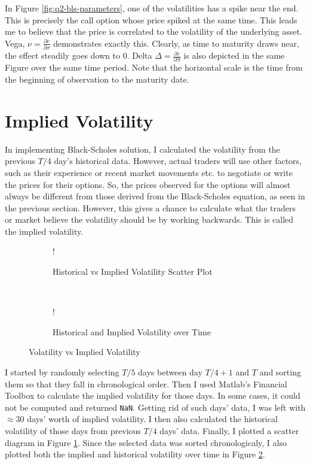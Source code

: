 \documentclass[11pt, fleqn]{article}
\begin{document}
In Figure \ref{fig:q2-bls-parameters}, one of the volatilities has a spike near the end. This is precisely the call option whose price spiked at the same time. This leads me to believe that the price is correlated to the volatility of the underlying asset. Vega, $\nu=\frac{\partial c}{\partial \sigma}$ demonstrates exactly this. Clearly, as time to maturity draws near, the effect steadily goes down to 0. Delta $\Delta=\frac{\partial c}{\partial S}$ is also depicted in the same Figure over the same time period. Note that the horizontal scale is the time from the beginning of observation to the maturity date.

\section{Implied Volatility}

In implementing Black-Scholes solution, I calculated the volatility from the previous $T/4$ day's historical data. However, actual traders will use other factors, such as their experience or recent market movements etc. to negotiate or write the prices for their options. So, the prices observed for the options will almost always be different from those derived from the Black-Scholes equation, as seen in the previous section. However, this gives a chance to calculate what the traders or market believe the volatility should be by working backwards. This is called the implied volatility.

\begin{figure}[!h]
   \centering 
   \begin{subfigure}[b]{0.45\textwidth}
     	\resizebox {\textwidth} {!} { }
		\caption{Historical vs Implied Volatility Scatter Plot}
		\label{fig:q3-historical-vs-implied-volatility}
    \end{subfigure}
    ~
    \begin{subfigure}[b]{0.44\textwidth}
       	\resizebox {\textwidth} {!} { }
		\caption{Historical and Implied Volatility over Time}
        \label{fig:q3-volatility-days}
    \end{subfigure}
    \caption{Volatility vs Implied Volatility}
	\label{fig:vol-vs-impl-vol}
\end{figure}

I started by randomly selecting $T/5$ days between day $T/4+1$ and $T$ and sorting them so that they fall in chronological order. Then I used Matlab's Financial Toolbox to calculate the implied volatility for those days. In some cases, it could not be computed and returned \texttt{NaN}. Getting rid of such days' data, I was left with $\approx 30$ days' worth of implied volatility. I then also calculated the historical volatility of those days from previous $T/4$ days' data. Finally, I plotted a scatter diagram in Figure \ref{fig:q3-historical-vs-implied-volatility}. Since the selected data was sorted chronologicaly, I also plotted both the implied and historical volatility over time in Figure \ref{fig:q3-volatility-days}.\\
\end{document}
